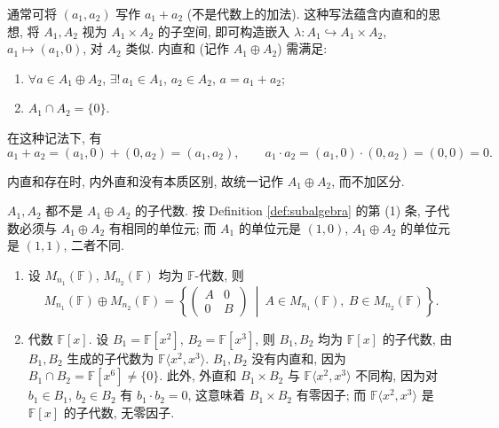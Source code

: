 通常可将 $(a_1,a_2)$ 写作 $a_1+a_2$ (不是代数上的加法). 这种写法蕴含内直和的思想,
将 $A_1,A_2$ 视为 $A_1\times A_2$ 的子空间, 即可构造嵌入
$\lambda\colon A_1\hookrightarrow A_1\times A_2$, $a_1\mapsto(a_1,0)$, 对 $A_2$ 类似.
内直和 (记作 $A_1\oplus A_2$) 需满足:
\begin{enumerate}
  \item $\forall a\in A_1\oplus A_2$, $\exists!\, a_1\in A_1$, $a_2\in A_2$, $a=a_1+a_2$;
  \item $A_1\cap A_2=\{0\}$.
\end{enumerate}
在这种记法下, 有
\[
  a_1+a_2=(a_1,0)+(0,a_2)=(a_1,a_2),\qquad
  a_1\cdot a_2=(a_1,0)\cdot(0,a_2)=(0,0)=0 .
\]

内直和存在时, 内外直和没有本质区别, 故统一记作 $A_1\oplus A_2$, 而不加区分.

\begin{remark}\label{rem:direct-sum-not-subalgebra}
$A_1,A_2$ 都不是 $A_1\oplus A_2$ 的子代数. 按 Definition \ref{def:subalgebra} 的第 (1) 条, 子代数必须与 $A_1\oplus A_2$ 有相同的单位元; 而 $A_1$ 的单位元是 $(1,0)$, $A_1\oplus A_2$ 的单位元是 $(1,1)$, 二者不同.
\end{remark}

\begin{example}\label{ex:block-diagonal-algebra}
\mbox{}\par\vspace{-0.2em}
\begin{enumerate}
  \item 设 $M_{n_1}(\mathbb{F})$, $M_{n_2}(\mathbb{F})$ 均为 $\mathbb{F}$-代数, 则
  \[
    M_{n_1}(\mathbb{F})\oplus M_{n_2}(\mathbb{F})
    =\left\{\begin{pmatrix}A&0\\0&B\end{pmatrix}
    \ \middle|\ A\in M_{n_1}(\mathbb{F}),\ B\in M_{n_2}(\mathbb{F})\right\}.
  \]
  \item 代数 $\mathbb{F}[x]$. 设 $B_1=\mathbb{F}[x^2]$, $B_2=\mathbb{F}[x^3]$, 则 $B_1,B_2$ 均为 $\mathbb{F}[x]$ 的子代数,
  由 $B_1,B_2$ 生成的子代数为 $\mathbb{F}\langle x^2,x^3\rangle$.
  $B_1,B_2$ 没有内直和, 因为 $B_1\cap B_2=\mathbb{F}[x^6]\neq\{0\}$.
  此外, 外直和 $B_1\times B_2$ 与 $\mathbb{F}\langle x^2,x^3\rangle$ 不同构,
  因为对 $b_1\in B_1$, $b_2\in B_2$ 有
  $b_1\cdot b_2=0$,
  这意味着 $B_1\times B_2$ 有零因子; 而 $\mathbb{F}\langle x^2,x^3\rangle$ 是 $\mathbb{F}[x]$ 的子代数,
  无零因子.
\end{enumerate}
\end{example}

